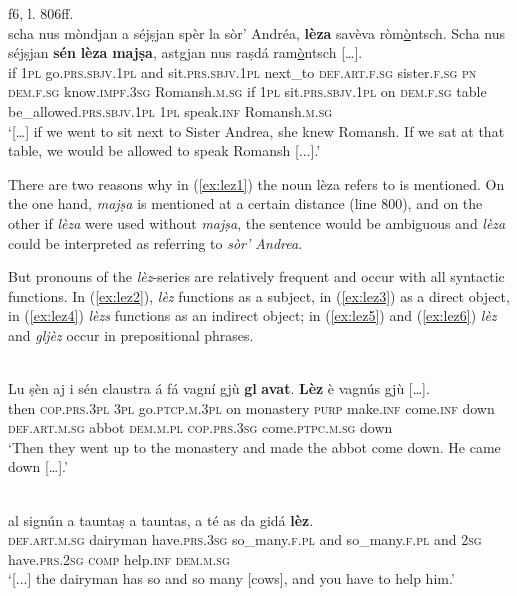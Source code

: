 \ea
\label{ex:lez1}
 {f6, l. 806ff.}\\
\gll […] scha nus mòndjan a séjṣjan spèr la sòr’ Andréa, \textbf{lèza} savèva ròm\underline{ò}ntsch. Scha nus séjṣjan \textbf{sén} \textbf{lèza} \textbf{majṣa}, astgjan nus raṣdá ram\underline{ò}ntsch […].\\
{} if \textsc{1pl} go.\textsc{prs.sbjv.1pl} and sit.\textsc{prs.sbjv.1pl} next\_to \textsc{def.art.f.sg} sister.\textsc{f.sg} \textsc{pn} \textsc{dem.f.sg} know.\textsc{impf.3sg} Romansh.\textsc{m.sg} if \textsc{1pl} sit.\textsc{prs.sbjv.1pl} on \textsc{dem.f.sg} table be\_allowed.\textsc{prs.sbjv.1pl} \textsc{1pl} speak.\textsc{inf} Romansh.\textsc{m.sg}\\
\glt `[…] if we went to sit next to Sister Andrea, she knew Romansh. If we sat at that table, we would be allowed to speak Romansh [...].'
\z

There are two reasons why in (\ref{ex:lez1}) the noun lèza refers to is mentioned. On the one hand, \textit{majṣa} is mentioned at a certain distance (line 800), and on the other if \textit{lèza} were used without \textit{majṣa}, the sentence would be ambiguous and \textit{lèza} could be interpreted as referring to \textit{sòr' Andrea}.
 
 But pronouns of the \textit{lèz}-series are relatively frequent and occur with all syntactic functions. In (\ref{ex:lez2}), \textit{lèz} functions as a subject, in (\ref{ex:lez3}) as a direct object, in (\ref{ex:lez4}) \textit{lèzs} functions as an indirect object; in (\ref{ex:lez5}) and (\ref{ex:lez6}) \textit{lèz} and \textit{gljèz} occur in prepositional phrases.
 
\ea
\label{ex:lez2}
\\
\gll Lu ṣèn aj i sén claustra á fá vagní gjù \textbf{gl} \textbf{avat}. \textbf{Lèz} è vagnús gjù […].\\
     then \textsc{cop.prs.3pl} \textsc{3pl} go.\textsc{ptcp.m.3pl} on monastery \textsc{purp} make.\textsc{inf} come.\textsc{inf} down \textsc{def.art.m.sg} abbot \textsc{dem.m.pl} \textsc{cop.prs.3sg} come.\textsc{ptpc.m.sg} down\\
\glt `Then they went up to the monastery and made the abbot come down. He came down […].'
\z

\ea
\label{ex:lez3}
\\
	\gll [...] al signún a tauntaṣ a tauntas, a té as da gidá \textbf{lèz}.\\
{} \textsc{def.art.m.sg} dairyman have\textsc{.prs.3sg} so\_many.\textsc{f.pl} and so\_many.\textsc{f.pl} and \textsc{2sg} have.\textsc{prs.2sg} \textsc{comp} help.\textsc{inf} \textsc{dem.m.sg}	\\
\glt `[...] the dairyman has so and so many [cows], and you have to help him.'
\z

